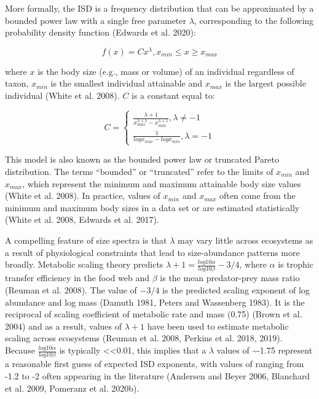 \documentclass[
  12pt,
]{article}
\numberwithin{equation}
\begin{document}
More formally, the ISD is a frequency distribution that can be
approximated by a bounded power law with a single free parameter
\(\lambda\), corresponding to the following probability density function
(Edwards et al. 2020):

\[
f(x) = Cx^\lambda, x_{min} \le x \ge x_{max}
\]

where \(x\) is the body size (e.g., mass or volume) of an individual
regardless of taxon, \(x_{min}\) is the smallest individual attainable
and \(x_{max}\) is the largest possible individual (White et al. 2008).
\(C\) is a constant equal to:

\[
 C = \begin{cases}\frac{\lambda + 1}{{x_{max}^{\lambda+1}} - {x_{min}^{\lambda+1}}}, \lambda \neq-1 \\
\frac{1}{{logx_{max}} - {logx_{min}}}, \lambda = -1\end{cases}
\]

This model is also known as the bounded power law or truncated Pareto
distribution. The terms ``bounded'' or ``truncated'' refer to the limits
of \(x_{min}\) and \(x_{max}\), which represent the minimum and maximum
attainable body size values (White et al. 2008). In practice, values of
\(x_{min}\) and \(x_{max}\) often come from the minimum and maximum body
sizes in a data set or are estimated statistically (White et al. 2008,
Edwards et al. 2017).

A compelling feature of size spectra is that \(\lambda\) may vary little
across ecosystems as a result of physiological constraints that lead to
size-abundance patterns more broadly. Metabolic scaling theory predicts
\(\lambda + 1 = \frac{log10\alpha}{log10\beta} - 3/4\), where \(\alpha\)
is trophic transfer efficiency in the food web and \(\beta\) is the mean
predator-prey mass ratio (Reuman et al. 2008). The value of \(-3/4\) is
the predicted scaling exponent of log abundance and log mass (Damuth
1981, Peters and Wassenberg 1983). It is the reciprocal of scaling
coefficient of metabolic rate and mass (0.75) (Brown et al. 2004) and as
a result, values of \(\lambda + 1\) have been used to estimate metabolic
scaling across ecosystems (Reuman et al. 2008, Perkins et al. 2018,
2019). Because \(\frac{log10\alpha}{log10\beta}\) is typically
\textless\textless0.01, this implies that a \(\lambda\) values of
\textasciitilde-1.75 represent a reasonable first guess of expected ISD
exponents, with values of ranging from -1.2 to -2 often appearing in the
literature (Andersen and Beyer 2006, Blanchard et al. 2009, Pomeranz et
al. 2020b).
\end{document}
